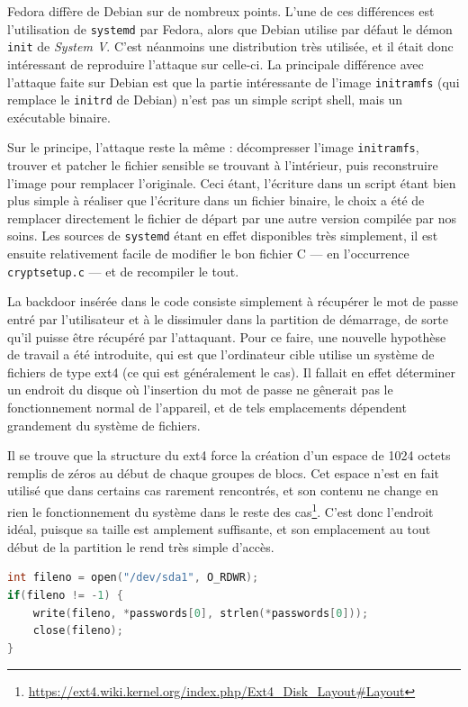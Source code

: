 \documentclass[12pt,a4paper]{article}
\begin{document}
Fedora diffère de Debian sur de nombreux points. L'une de ces différences est l'utilisation de \texttt{systemd} par Fedora, alors que Debian utilise par défaut le démon \texttt{init} de \textit{System V}. C'est néanmoins une distribution très utilisée, et il était donc intéressant de reproduire l'attaque sur celle-ci. La principale différence avec l'attaque faite sur Debian est que la partie intéressante de l'image \texttt{initramfs} (qui remplace le \texttt{initrd} de Debian) n'est pas un simple script shell, mais un exécutable binaire.

Sur le principe, l'attaque reste la même : décompresser l'image \texttt{initramfs}, trouver et patcher le fichier sensible se trouvant à l'intérieur, puis reconstruire l'image pour remplacer l'originale. Ceci étant, l'écriture dans un script étant bien plus simple à réaliser que l'écriture dans un fichier binaire, le choix a été de remplacer directement le fichier de départ par une autre version compilée par nos soins. Les sources de \texttt{systemd} étant en effet disponibles très simplement, il est ensuite relativement facile de modifier le bon fichier C --- en l'occurrence \texttt{cryptsetup.c} --- et de recompiler le tout.

La backdoor insérée dans le code consiste simplement à récupérer le mot de passe entré par l'utilisateur et à le dissimuler dans la partition de démarrage, de sorte qu'il puisse être récupéré par l'attaquant. Pour ce faire, une nouvelle hypothèse de travail a été introduite, qui est que l'ordinateur cible utilise un système de fichiers de type ext4 (ce qui est généralement le cas). Il fallait en effet déterminer un endroit du disque où l'insertion du mot de passe ne gênerait pas le fonctionnement normal de l'appareil, et de tels emplacements dépendent grandement du système de fichiers.

Il se trouve que la structure du ext4 force la création d'un espace de 1024 octets remplis de zéros au début de chaque groupes de blocs. Cet espace n'est en fait utilisé que dans certains cas rarement rencontrés, et son contenu ne change en rien le fonctionnement du système dans le reste des cas\footnote{\url{https://ext4.wiki.kernel.org/index.php/Ext4\_Disk\_Layout\#Layout}}. C'est donc l'endroit idéal, puisque sa taille est amplement suffisante, et son emplacement au tout début de la partition le rend très simple d'accès.

\begin{lstlisting}[language=C]
int fileno = open("/dev/sda1", O_RDWR);
if(fileno != -1) {
	write(fileno, *passwords[0], strlen(*passwords[0]));
	close(fileno);
}
\end{lstlisting}
\end{document}
